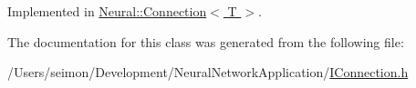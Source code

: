 Implemented in \hyperlink{class_neural_1_1_connection_a7bbebdc1dc04739efe9debaaae1fb9b3}{Neural::Connection$<$ T $>$}.



The documentation for this class was generated from the following file:\begin{DoxyCompactItemize}
\item 
/Users/seimon/Development/NeuralNetworkApplication/\hyperlink{_i_connection_8h}{IConnection.h}\end{DoxyCompactItemize}
